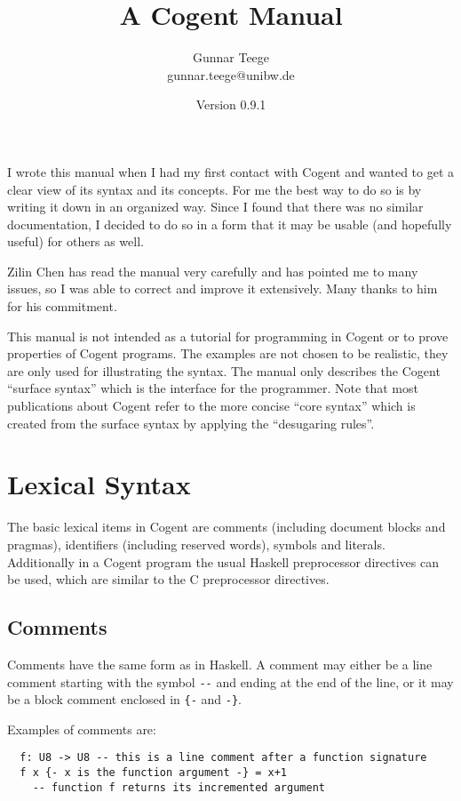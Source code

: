 \documentclass[a4paper]{report}
\newcommand{\code}[1]{\textnormal{\texttt{#1}}}
\newcommand{\cogent}{Cogent\xspace}
\begin{document}
\title{A \cogent Manual}
\author{Gunnar Teege\\ gunnar.teege{@}unibw.de}
\date{Version 0.9.1}

\maketitle

I wrote this manual when I had my first contact with \cogent and wanted to get a clear view of its syntax and its concepts.
For me the best way to do so is by writing it down in an organized way. Since I found that there was no similar documentation,
I decided to do so in a form that it may be usable (and hopefully useful) for others as well.

Zilin Chen has read the manual very carefully and has pointed me to many issues, so I was able to correct and improve it 
extensively. Many thanks to him for his commitment.

This manual is not intended as a tutorial for programming in \cogent or to prove properties of \cogent programs. The examples
are not chosen to be realistic, they are only used for illustrating the syntax. The manual only describes the \cogent
``surface syntax'' which is the interface for the programmer. Note that most publications about \cogent refer to the more
concise ``core syntax'' which is created from the surface syntax by applying the ``desugaring rules''.

\chapter{Lexical Syntax}


The basic lexical items in \cogent are comments (including document blocks and pragmas), identifiers (including reserved words), symbols and literals.
Additionally in a \cogent program the usual Haskell preprocessor directives can be used, which are similar to the C preprocessor directives.


\section{Comments}

Comments have the same form as in Haskell. A comment may either be a line comment
starting with the symbol \code{-}\code{-} and ending at the end of the line, or it may
be a block comment enclosed in \code{\{-} and \code{-\}}.

Examples of comments are:
\begin{verbatim}
  f: U8 -> U8 -- this is a line comment after a function signature
  f x {- x is the function argument -} = x+1
    -- function f returns its incremented argument
\end{verbatim}
\end{document}
